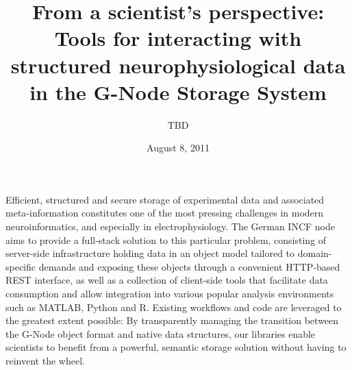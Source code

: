 \documentclass[a4paper]{article}
\begin{document}
\title{From a scientist's perspective: Tools for interacting with
  structured neurophysiological data in the G-Node Storage System}

\author{TBD} %
\date{August 8, 2011}

\maketitle


Efficient, structured and secure storage of experimental data and
associated meta-information constitutes one of the most pressing
challenges in modern neuroinformatics, and especially in
electrophysiology. The German INCF node aims to provide a full-stack
solution to this particular problem, consisting of server-side
infrastructure holding data in an object model tailored to
domain-specific demands and exposing these objects through a
convenient HTTP-based REST interface, as well as a collection of
client-side tools that facilitate data consumption and allow
integration into various popular analysis environments such as MATLAB,
Python and R. Existing workflows and code are leveraged to the
greatest extent possible: By transparently managing the transition
between the G-Node object format and native data structures, our
libraries enable scientists to benefit from a powerful, semantic
storage solution without having to reinvent the wheel.
\end{document}
